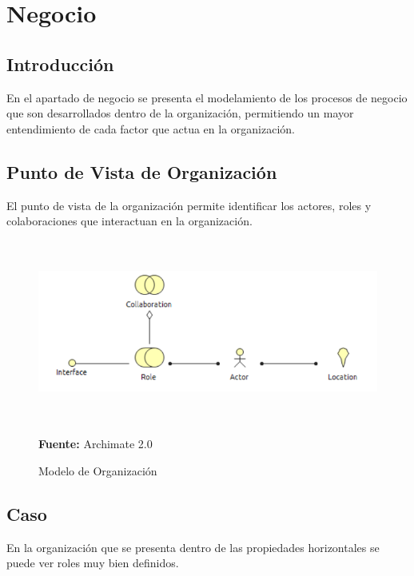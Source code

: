 \section{Negocio}
\subsection{Introducción}

En el apartado de negocio se presenta el modelamiento de los procesos de negocio que son desarrollados dentro de la organización, permitiendo un mayor entendimiento de cada factor que actua en la organización.

\newpage

\subsection{Punto de Vista de Organización}

El punto de vista de la organización permite identificar los actores, roles y colaboraciones que interactuan en la organización.


\begin{figure}[th!]
	\centering
	\includegraphics[width=13cm,height=6cm]{arquitectura/negocio/imgs/m_organizacion}
	\caption{Modelo de Organización}{\scriptsize \textbf{Fuente:} Archimate 2.0}
\end{figure}

\subsection{Caso}

En la organización que se presenta dentro de las propiedades horizontales se puede ver roles muy bien definidos.

